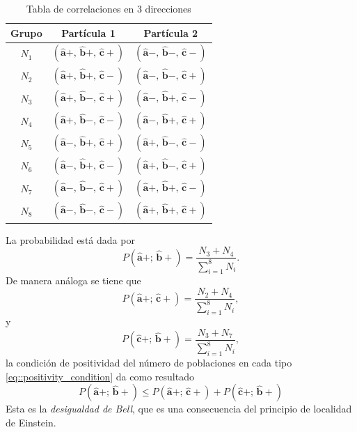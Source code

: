 \documentclass[a4paper]{article}
\begin{document}
\begin{table}
\centering
\begin{tabular}{|c|c|c|}
\hline
\toprule
\textbf{Grupo} & \textbf{Partícula 1} & \textbf{Partícula 2} \\
\midrule
$N_1$ & $(\mathbf{\hat{a}}+,\, \mathbf{\hat{b}}+,\,\mathbf{\hat{c}}+)$ & $(\mathbf{\hat{a}}-,\, \mathbf{\hat{b}}-,\,\mathbf{\hat{c}}-)$\\
$N_2$ & $(\mathbf{\hat{a}}+,\, \mathbf{\hat{b}}+,\,\mathbf{\hat{c}}-)$ & $(\mathbf{\hat{a}}-,\, \mathbf{\hat{b}}-,\,\mathbf{\hat{c}}+)$\\
$N_3$ & $(\mathbf{\hat{a}}+,\, \mathbf{\hat{b}}-,\,\mathbf{\hat{c}}+)$ & $(\mathbf{\hat{a}}-,\, \mathbf{\hat{b}}+,\,\mathbf{\hat{c}}-)$\\
$N_4$ & $(\mathbf{\hat{a}}+,\, \mathbf{\hat{b}}-,\,\mathbf{\hat{c}}-)$ & $(\mathbf{\hat{a}}-,\, \mathbf{\hat{b}}+,\,\mathbf{\hat{c}}+)$\\
$N_5$ & $(\mathbf{\hat{a}}-,\, \mathbf{\hat{b}}+,\,\mathbf{\hat{c}}+)$ & $(\mathbf{\hat{a}}+,\, \mathbf{\hat{b}}-,\,\mathbf{\hat{c}}-)$\\
$N_6$ & $(\mathbf{\hat{a}}-,\, \mathbf{\hat{b}}+,\,\mathbf{\hat{c}}-)$ & $(\mathbf{\hat{a}}+,\, \mathbf{\hat{b}}-,\,\mathbf{\hat{c}}+)$\\
$N_7$ & $(\mathbf{\hat{a}}-,\, \mathbf{\hat{b}}-,\,\mathbf{\hat{c}}+)$ & $(\mathbf{\hat{a}}+,\, \mathbf{\hat{b}}+,\,\mathbf{\hat{c}}-)$\\
$N_8$ & $(\mathbf{\hat{a}}-,\, \mathbf{\hat{b}}-,\,\mathbf{\hat{c}}-)$ & $(\mathbf{\hat{a}}+,\, \mathbf{\hat{b}}+,\,\mathbf{\hat{c}}+)$\\
\bottomrule
\hline
\end{tabular}
\caption{Tabla de correlaciones en 3 direcciones}
    \label{tab:three_direction_correlations}
\end{table}
La probabilidad está dada por 
\begin{equation*}
P(\mathbf{\hat{a}}+;\, \mathbf{\hat{b}}+) = \frac{N_3+N_4}{\sum_{i=1}^{8} N_i} .
\end{equation*}
De manera análoga se tiene que 
\begin{equation*}
P(\mathbf{\hat{a}}+;\, \mathbf{\hat{c}}+) = \frac{N_2+N_4}{\sum_{i=1}^{8} N_i} ,
\end{equation*}
y
\begin{equation*}
P(\mathbf{\hat{c}}+;\, \mathbf{\hat{b}}+) = \frac{N_3+N_7}{\sum_{i=1}^{8} N_i} ,
\end{equation*}
la condición de positividad del número de poblaciones en cada tipo \ref{eq::positivity_condition} da como resultado
\begin{equation}\label{eq::Bell_inequality}
P(\mathbf{\hat{a}}+;\, \mathbf{\hat{b}}+) \leq P(\mathbf{\hat{a}}+;\, \mathbf{\hat{c}}+) + P(\mathbf{\hat{c}}+;\, \mathbf{\hat{b}}+)  
\end{equation}
Esta es la \textit{desigualdad de Bell}, que es una consecuencia del principio de localidad de Einstein.
\end{document}
